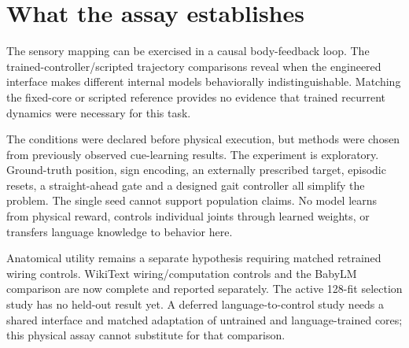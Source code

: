 \documentclass[10pt]{article}
\begin{document}
\section{What the assay establishes}
The sensory mapping can be exercised in a causal body-feedback loop. The
trained-controller/scripted trajectory comparisons reveal when the engineered
interface makes different internal models behaviorally indistinguishable.
Matching the fixed-core or scripted reference provides no evidence that
trained recurrent dynamics were necessary for this task.

The conditions were declared before physical execution, but methods were chosen
from previously observed cue-learning results. The experiment is exploratory.
Ground-truth position, sign encoding, an externally prescribed target, episodic
resets, a straight-ahead gate and a designed gait controller all simplify the
problem. The single seed cannot support population claims. No model learns from
physical reward, controls individual joints through learned weights, or transfers
language knowledge to behavior here.

Anatomical utility remains a separate hypothesis requiring matched retrained
wiring controls. WikiText wiring/computation controls and the BabyLM comparison
are now complete and reported separately. The active 128-fit selection study
has no held-out result yet. A deferred language-to-control study needs a shared interface
and matched adaptation of untrained and language-trained cores; this physical
assay cannot substitute for that comparison.



\end{document}
